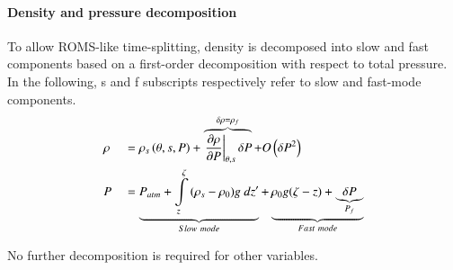 \paragraph{Density and pressure decomposition}
\indent To allow ROMS-like time-splitting, density is decomposed into slow and fast components based on a first-order decomposition with respect to total pressure. In the following, s and f subscripts respectively refer to slow and fast-mode components.\\
\begin{alignat}{2}
  \displaystyle
  &\rho &&=\rho_{s}\left(\theta,s,P\right)
  +\overbrace{\left.{\frac{\partial{\rho}}{\partial{P}}}\right|_{\theta,s}\delta{P}}^{\delta{\rho}=\rho_{f}}
  +O\left(\delta{P}^2\right)\\
  &P &&=\underbrace{P_{atm}
  +\int\limits_z^{\zeta}{(\rho_{s}-\rho_0)g\ dz'}}_{Slow\ mode}
  +\underbrace{\rho_{0}g(\zeta-z)+\underbrace{\delta P}_{P_{f}}}_{Fast\ mode}
\end{alignat}
  
No further decomposition is required for other variables.
  
 
